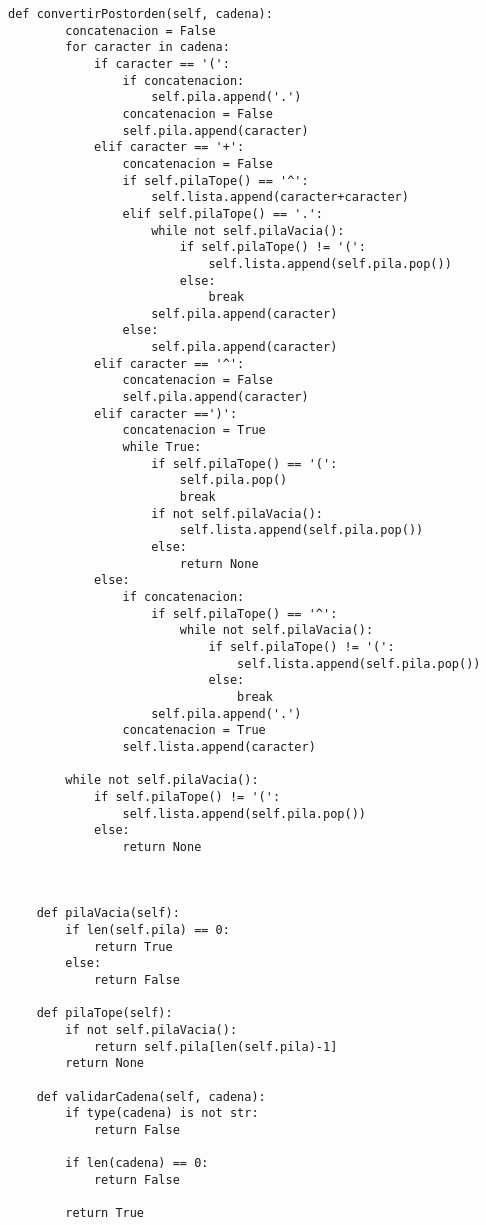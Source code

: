 \begin{lstlisting}[frame=single]
    def convertirPostorden(self, cadena):
        concatenacion = False
        for caracter in cadena:
            if caracter == '(':
                if concatenacion:
                    self.pila.append('.')
                concatenacion = False
                self.pila.append(caracter)
            elif caracter == '+':
                concatenacion = False
                if self.pilaTope() == '^':
                    self.lista.append(caracter+caracter)
                elif self.pilaTope() == '.':
                    while not self.pilaVacia():
                        if self.pilaTope() != '(':
                            self.lista.append(self.pila.pop())
                        else:
                            break
                    self.pila.append(caracter)
                else:
                    self.pila.append(caracter)
            elif caracter == '^':
                concatenacion = False
                self.pila.append(caracter)
            elif caracter ==')':
                concatenacion = True
                while True:
                    if self.pilaTope() == '(':
                        self.pila.pop()
                        break
                    if not self.pilaVacia():
                        self.lista.append(self.pila.pop())
                    else:
                        return None
            else:
                if concatenacion:
                    if self.pilaTope() == '^':
                        while not self.pilaVacia():
                            if self.pilaTope() != '(':
                                self.lista.append(self.pila.pop())
                            else:
                                break
                    self.pila.append('.')
                concatenacion = True
                self.lista.append(caracter)

        while not self.pilaVacia():
            if self.pilaTope() != '(':
                self.lista.append(self.pila.pop())
            else:
                return None



    def pilaVacia(self):
        if len(self.pila) == 0:
            return True
        else:
            return False

    def pilaTope(self):
        if not self.pilaVacia():
            return self.pila[len(self.pila)-1]
        return None

    def validarCadena(self, cadena):
        if type(cadena) is not str:
            return False

        if len(cadena) == 0:
            return False

        return True
\end{lstlisting}












